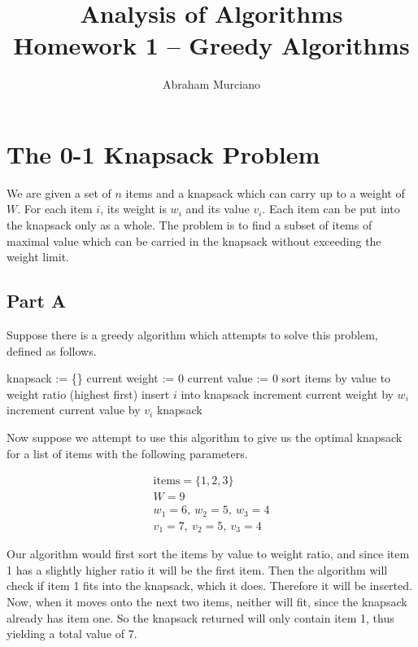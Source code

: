 \documentclass{article}
\title{Analysis of Algorithms \\
\medskip
\large Homework 1 -- Greedy Algorithms}
\author{Abraham Murciano}
\begin{document}
\maketitle

\section{The 0-1 Knapsack Problem}

We are given a set of \(n\) items and a knapsack which can carry up to a weight of \(W\). For each item \(i\), its weight is \(w_i\) and its value \(v_i\). Each item can be put into the knapsack only as a whole. The problem is to find a subset of items of maximal value which can be carried in the knapsack without exceeding the weight limit.

\subsection*{Part A}

Suppose there is a greedy algorithm which attempts to solve this problem, defined as follows.

\begin{algorithm}
	\begin{algorithmic}
		\State knapsack := \{\}
		\State current weight := 0
		\State current value := 0
		\State sort items by value to weight ratio (highest first)
		\State insert \(i\) into knapsack
		\State increment current weight by \(w_i\)
		\State increment current value by \(v_i\)
		\EndIf
		\EndFor
		\Return knapsack
		\EndFunction
	\end{algorithmic}
\end{algorithm}

Now suppose we attempt to use this algorithm to give us the optimal knapsack for a list of items with the following parameters.

\begin{gather*}
	\text{items} = \{1, 2, 3\}\\
	W = 9\\
	w_1 = 6,\ w_2 = 5,\ w_3 = 4\\
	v_1 = 7,\ v_2 = 5,\ v_3 = 4
\end{gather*}

Our algorithm would first sort the items by value to weight ratio, and since item 1 has a slightly higher ratio it will be the first item. Then the algorithm will check if item 1 fits into the knapsack, which it does. Therefore it will be inserted. Now, when it moves onto the next two items, neither will fit, since the knapsack already has item one. So the knapsack returned will only contain item 1, thus yielding a total value of 7.
\end{document}
